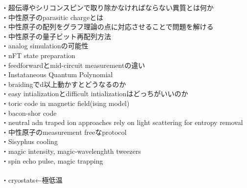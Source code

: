 \documentclass[a4paper,10.5pt]{ltjsarticle}
\begin{document}
\vspace{50pt}
・超伝導やシリコンスピンで取り除かなければならない異質とは何か\\
・中性原子のparasitic chargeとは\\
・中性原子の配列をグラフ理論の点に対応させることで問題を解ける\\
・中性原子の量子ビット再配列方法\\
・analog simulationの可能性\\
・nFT state preparation\\
・feedforwardとmid-circuit measurementの違い\\
・Instataneous Quantum Polynomial\\
・braidingでd以上動かすとどうなるのか\\
・easy intializationとdifficult intializationはどっちがいいのか\\
・toric code in magnetic field(ising model)\\
・bacon-shor code\\
・neutral adn traped ion approaches rely on light scattering for entropy removal\\
・中性原子のmeasurement freeなprotocol\\
・Sisyphus cooling\\
・magic intensity, magic-wavelenghth tweezers\\
・spin echo pulse, magic trapping\\
\\
・cryostats←極低温\\
\\
\end{document}
